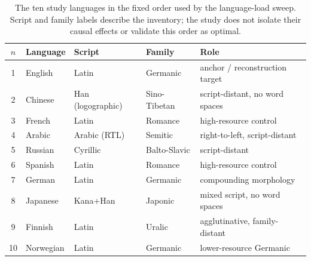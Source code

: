 \begin{table}[t]
\centering
\caption{The ten study languages in the fixed order used by the language-load sweep. Script and family labels describe the inventory; the study does not isolate their causal effects or validate this order as optimal.}
\label{tab:languages}
\small
\begin{tabular}{c l l l l}\toprule
$n$ & Language & Script & Family & Role \\\midrule
1 & English & Latin & Germanic & anchor / reconstruction target \\
2 & Chinese & Han (logographic) & Sino-Tibetan & script-distant, no word spaces \\
3 & French & Latin & Romance & high-resource control \\
4 & Arabic & Arabic (RTL) & Semitic & right-to-left, script-distant \\
5 & Russian & Cyrillic & Balto-Slavic & script-distant \\
6 & Spanish & Latin & Romance & high-resource control \\
7 & German & Latin & Germanic & compounding morphology \\
8 & Japanese & Kana+Han & Japonic & mixed script, no word spaces \\
9 & Finnish & Latin & Uralic & agglutinative, family-distant \\
10 & Norwegian & Latin & Germanic & lower-resource Germanic \\
\bottomrule\end{tabular}\end{table}